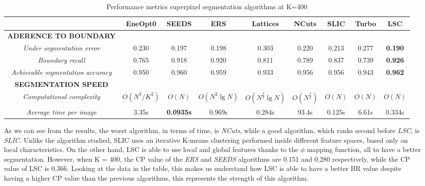 \begin{table}[h!]
    \centering
    \begin{adjustbox}{max width=\textwidth}
    \begin{tabular}{*{9}{|c}|}%
        \hline
        & EneOpt0 & SEEDS & ERS & Lattices & NCuts & SLIC & Turbo & LSC \\
        \hline
        \bfseries{ADERENCE TO BOUNDARY} & & & & & & & & \\
        \emph{Under segmentation error} & 0.230 & 0.197 & 0.198 & 0.303 & 0.220 & 0.213 & 0.277 & \bfseries{0.190}\\
        \emph{Boundary recall} & 0.765 & 0.918 & 0.920 & 0.811 & 0.789 & 0.837 & 0.739 & \bfseries{0.926}\\
        \emph{Achievable segmentation accuracy} & 0.950 & 0.960 & 0.959 & 0.933 & 0.956 & 0.956 & 0.943 & \bfseries{0.962}\\
        \hline
        \bfseries{SEGMENTATION SPEED} & & & & & & & & \\
        \emph{Computational complexity} & $ O(N^3/K^2) $ & $ O(N) $ & $ O(N^2 \lg{N}) $ & $ O(N^{\frac{3}{2}} \lg{N}) $ & $ O(N^{\frac{3}{2}}) $ & $ O(N) $ & $ O(N) $ & $ O(N) $\\
        \emph{Average time per image} & 3.35s & \bfseries{0.0935}s & 0.969s & 0.284s & 93.4s & 0.125s & 6.61s & 0.334s\\
        \hline
    \end{tabular}
    \end{adjustbox}
    \caption{Performance metrics superpixel segmentation algorithms at K=400}
    \label{table superpixels}
\end{table}
As we can see from the results, the worst algorithm, in terms of time, 
is \emph{NCuts}, while a good algorithm, which ranks second before \emph{LSC}, is \emph{SLIC}. 
Unlike the algorithm studied, SLIC uses an iterative K-means clustering 
performed inside different feature spaces, based only on local characteristics. 
On the other hand, LSC is able to use local and global features thanks to the 
$ \phi $  mapping function, all to have a better segmentation. However, when 
K = 400, the CP value of the \emph{ERS} \cite{0781426508} and \emph{SEEDS} \cite{0781426509} algorithms are 0.151 
and 0.280 respectively, while the CP value of LSC is 0.366. Looking at the data 
in the table, this makes us understand how LSC is able to have a better BR 
value despite having a higher CP value than the previous algorithms, this 
represents the strength of this algorithm. 

